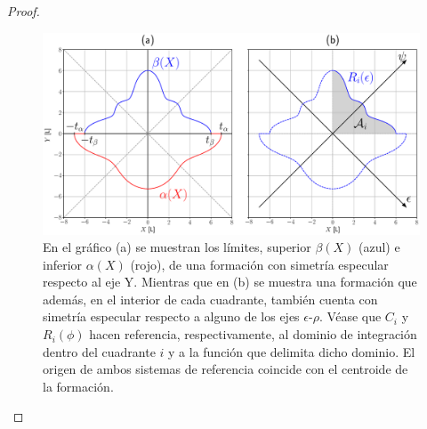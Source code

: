 \begin{proof}
\begin{figure}[h]
    \centering
    \includegraphics[trim={0 3cm 0 3.5cm}, clip, width=1\columnwidth]{./fig/obs_xxyy.eps}
    \caption{En el gráfico (a) se muestran los límites, superior $\beta(X)$ (azul) e inferior $\alpha(X)$ (rojo), de una formación con simetría especular respecto al eje Y. Mientras que en (b) se muestra una formación que además, en el interior de cada cuadrante, también cuenta con simetría especular respecto a alguno de los ejes $\epsilon$-$\rho$. Véase que $C_i$ y $R_i(\phi)$ hacen referencia, respectivamente, al dominio de integración dentro del cuadrante $i$ y a la función que delimita dicho dominio. El origen de ambos sistemas de referencia coincide con el centroide de la formación.}
    \label{fig: obs_xxyy}
\end{figure}
\end{proof}





